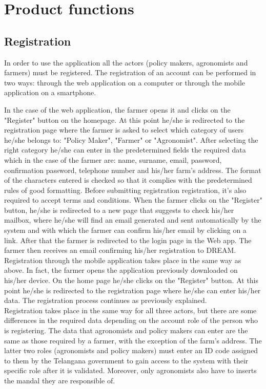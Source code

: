 \section{Product functions}

\subsection{Registration}
In order to use the application all the actors (policy makers, agronomists and farmers) must be registered. The registration of an account can be performed in two ways: through the web application on a computer or through the mobile application on a smartphone.

In the case of the web application, the farmer opens it and clicks on the "Register" button on the homepage. At this point he/she is redirected to the registration page where the farmer is asked to select which category of users he/she belongs to: "Policy Maker", "Farmer" or "Agronomist".
After selecting the right category he/she can enter in the predetermined fields the required data which in the case of the farmer are: name, surname, email, password, confirmation password, telephone number and his/her farm's address. The format of the characters entered is checked so that it complies with the predetermined rules of good formatting. Before submitting registration registration, it's also required to accept terms and conditions.
When the farmer clicks on the "Register" button, he/she is redirected to a new page that suggests to check his/her mailbox, where he/she will find an email generated and sent automatically by the system and with which the farmer can confirm his/her email by clicking on a link. After that the farmer is redirected to the login page in the Web app. The farmer then receives an email confirming his/her registration to DREAM.\\

Registration through the mobile application takes place in the same way as above. In fact, the farmer opens the application previously downloaded on his/her device. On the home page he/she clicks on the "Register" button. At this point he/she is redirected to the registration page where he/she can enter his/her data. The registration process continues as previously explained.\\

Registration takes place in the same way for all three actors, but there are some differences in the required data depending on the account role of the person who is registering. The data that agronomists and policy makers can enter are the same as those required by a farmer, with the exception of the farm's address.
The latter two roles (agronomists and policy makers) must enter an ID code assigned to them by the Telangana government to gain access to the system with their specific role after it is validated.
Moreover, only agronomists also have to inserts the mandal they are responsible of.


